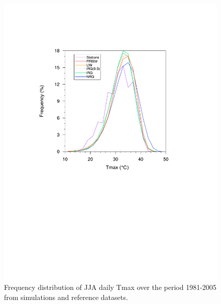 \begin{figure}
\begin{center}
\includegraphics[width=6in]{irrig_pdf.pdf}
\caption{Frequency distribution of JJA daily Tmax over the period 1981-2005 from simulations and reference datasets.}
\label{fig:Figure 5}
\end{center}
\end{figure}

